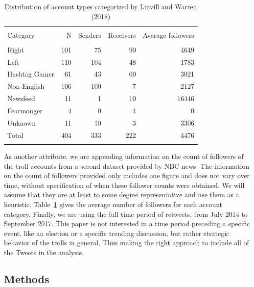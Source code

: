 \documentclass[12pt, titlepage=true, toc=bib]{scrartcl}
\begin{document}
\begin{table}[!ht] \centering 
\begin{tabular*}{.95\linewidth}{@{\extracolsep{\fill}} lrrrr} 
\\[-1.8ex]\hline 
\hline \\[-1.8ex] 
Category & N & Senders & Receivers & Average followers \\ 
\hline \\[-1.8ex] 
Right & 101 & 75 & 90 & 4649 \\ 
Left & 110 & 104 & 48 & 1783 \\ 
Hashtag Gamer & 61 & 43 & 60 & 3021 \\ 
Non-English & 106 & 100 & 7 & 2127 \\ 
Newsfeed & 11 & 1 & 10 & 16446 \\ 
Fearmonger & 4 & 0 & 4 & 0 \\ 
Unknown & 11 & 10 & 3 & 3306 \\ 
Total & 404 & 333 & 222 & 4476 \\ 
\hline \\[-1.8ex] 
\end{tabular*} 
  \caption[Troll Statistics]{Distribution of account types categorized by Linvill and Warren (2018)}
  \label{tab:trollstat} 
\end{table} 
 
As another attribute, we are appending information on the count of followers of the troll accounts from a second dataset provided by NBC news. The information on the count of followers provided only includes one figure and does not vary over time, without specification of when these follower counts were obtained. We will assume that they are at least to some degree representative and use them as a heuristic. Table~\ref{tab:trollstat} gives the average number of followers for each account category. Finally, we are using the full time period of retweets, from July 2014 to September 2017. This paper is not interested in a time period preceding a specific event, like an election or a specific trending discussion, but rather strategic behavior of the trolls in general, Thus making the right approach to include all of the Tweets in the analysis.


\subsection{Methods}
\end{document}
